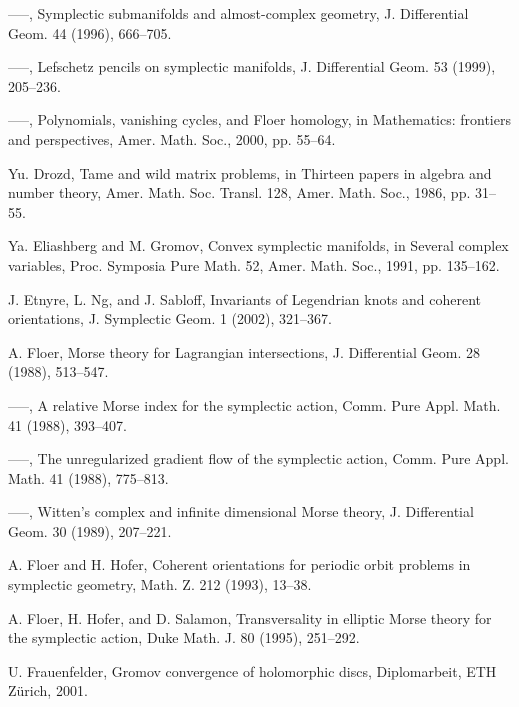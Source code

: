 \begin{list}{}{\setlength{\leftmargin}{3em}\setlength{\labelwidth}{2.5em}\setlength{\itemsep}{.5em}\small}
\item[\hypertarget{bib:38}{[38]}] —–, Symplectic submanifolds and almost-complex geometry, J. Differential Geom. 44 (1996), 666–705. 
\item[\hypertarget{bib:39}{[39]}] —–, Lefschetz pencils on symplectic manifolds, J. Differential Geom. 53 (1999), 205–236. 
\item[\hypertarget{bib:40}{[40]}] —–, Polynomials, vanishing cycles, and Floer homology, in Mathematics: frontiers and perspectives, Amer. Math. Soc., 2000, pp. 55–64. 
\item[\hypertarget{bib:41}{[41]}] Yu. Drozd, Tame and wild matrix problems, in Thirteen papers in algebra and number theory, Amer. Math. Soc. Transl. 128, Amer. Math. Soc., 1986, pp. 31–55. 
\item[\hypertarget{bib:42}{[42]}] Ya. Eliashberg and M. Gromov, Convex symplectic manifolds, in Several complex variables, Proc. Symposia Pure Math. 52, Amer. Math. Soc., 1991, pp. 135–162. 
\item[\hypertarget{bib:43}{[43]}] J. Etnyre, L. Ng, and J. Sabloff, Invariants of Legendrian knots and coherent orientations, J. Symplectic Geom. 1 (2002), 321–367. 
\item[\hypertarget{bib:44}{[44]}] A. Floer, Morse theory for Lagrangian intersections, J. Differential Geom. 28 (1988), 513–547. 
\item[\hypertarget{bib:45}{[45]}] —–, A relative Morse index for the symplectic action, Comm. Pure Appl. Math. 41 (1988), 393–407. 
\item[\hypertarget{bib:46}{[46]}] —–, The unregularized gradient flow of the symplectic action, Comm. Pure Appl. Math. 41 (1988), 775–813. 
\item[\hypertarget{bib:47}{[47]}] —–, Witten's complex and infinite dimensional Morse theory, J. Differential Geom. 30 (1989), 207–221. 
\item[\hypertarget{bib:48}{[48]}] A. Floer and H. Hofer, Coherent orientations for periodic orbit problems in symplectic geometry, Math. Z. 212 (1993), 13–38. 
\item[\hypertarget{bib:49}{[49]}] A. Floer, H. Hofer, and D. Salamon, Transversality in elliptic Morse theory for the symplectic action, Duke Math. J. 80 (1995), 251–292. 
\item[\hypertarget{bib:50}{[50]}] U. Frauenfelder, Gromov convergence of holomorphic discs, Diplomarbeit, ETH Zürich, 2001. 

\end{list}
